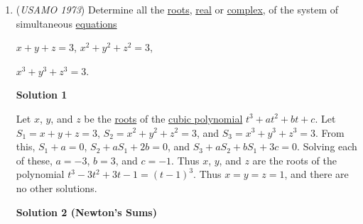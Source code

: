 \begin{enumerate}
 Then the probability that our triangle does NOT contain the center is 
 \[p = \frac{ (2n+1){\binom{n}{2}} }{ {\binom{2n+1}{3} } } = \frac{ (1/2)(2n+1)(n)(n-1) }{ (1/6)(2n+1)(2n)(2n-1) } =  \frac{ 3n-3 }{ 4n-2 }\]

 And then the probability we seek is 
 \[1-p =  \frac{ (4n-2) - (3n-3) }{ (4n-2) } = \boxed{\frac{n+1}{4n-2}}\]

 \textbf{Perplexing Edge Case} However, for $n = 1$, (a rare edge case), the circumcenter of the triangle must lie in the center of the triangle, which is notably difficult to prove if not assumed, resulting in a probability of $1$.

 Observe that the probability tends to $\frac{1}{4}$ as $n$ approaches infinity. Why does this occur?

 
<i>Alternate solutions are always welcome. If you have a different, elegant solution to this problem, please \href{https://artofproblemsolving.com/wiki/index.php?title=1973\_USAMO\_Problems/Problem\_3&action=edit}{add it} to this page.</i>



	\item (\textit{USAMO 1973}) Determine all the \href{https://artofproblemsolving.com/wiki/index.php?title=Root}{roots}, \href{https://artofproblemsolving.com/wiki/index.php?title=Real}{real} or \href{https://artofproblemsolving.com/wiki/index.php?title=Complex}{complex}, of the system of simultaneous \href{https://artofproblemsolving.com/wiki/index.php?title=Equation}{equations}


 $x+y+z=3$,
$x^2+y^2+z^2=3$,


 
$x^3+y^3+z^3=3$.

 



\textbf{Solution 1}

Let $x$, $y$, and $z$ be the \href{https://artofproblemsolving.com/wiki/index.php?title=Root}{roots} of the \href{https://artofproblemsolving.com/wiki/index.php?title=Cubic\_polynomial}{cubic polynomial} $t^3+at^2+bt+c$. Let $S_1=x+y+z=3$, $S_2=x^2+y^2+z^2=3$, and $S_3=x^3+y^3+z^3=3$. From this, $S_1+a=0$, $S_2+aS_1+2b=0$, and $S_3+aS_2+bS_1+3c=0$. Solving each of these, $a=-3$, $b=3$, and $c=-1$. Thus $x$, $y$, and $z$ are the roots of the polynomial $t^3-3t^2+3t-1=(t-1)^3$. Thus $x=y=z=1$, and there are no other solutions.

 



\textbf{Solution 2 (Newton's Sums)}


\end{enumerate}
